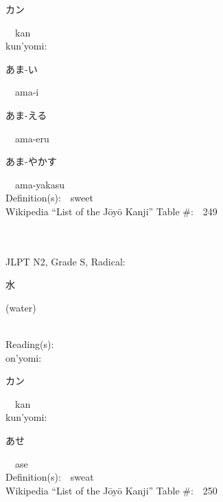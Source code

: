 \begin{multicols}{2}
{\hspace*{2em}}{\begin{CJK}{UTF8}{min} カン \end{CJK}}\ \ kan\ \ \\
{\hspace*{1em}}kun'yomi:\ \ \\
{\hspace*{2em}}{\begin{CJK}{UTF8}{min} あま-い \end{CJK}}\ \ ama-i\ \ \\
{\hspace*{2em}}{\begin{CJK}{UTF8}{min} あま-える \end{CJK}}\ \ ama-eru\ \ \\
{\hspace*{2em}}{\begin{CJK}{UTF8}{min} あま-やかす \end{CJK}}\ \ ama-yakasu\ \ \\
Definition(s):\ \ sweet \\
Wikipedia ``List of the J\=oy\=o Kanji'' Table \#:\ \ 249 \\
\ \ \\
{\fontsize{34pt}{40pt}  }\ \ \\  %
{JLPT N2, Grade S, Radical:\ \ {\begin{CJK}{UTF8}{min} 水 \end{CJK}} (water) } \\
Reading(s):\ \ \\
{\hspace*{1em}}on'yomi:\ \ \\
{\hspace*{2em}}{\begin{CJK}{UTF8}{min} カン \end{CJK}}\ \ kan\ \ \\
{\hspace*{1em}}kun'yomi:\ \ \\
{\hspace*{2em}}{\begin{CJK}{UTF8}{min} あせ \end{CJK}}\ \ ase\ \ \\
Definition(s):\ \ sweat \\
Wikipedia ``List of the J\=oy\=o Kanji'' Table \#:\ \ 250 \\

\end{multicols}
